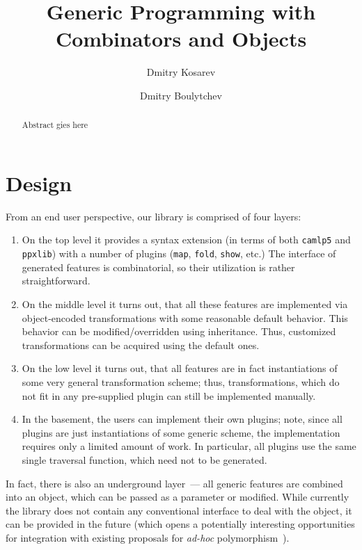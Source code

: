 \documentclass[submission,copyright,creativecommons]{eptcs}
\title{Generic Programming with Combinators and Objects}
\author{Dmitry Kosarev
  \institute{St. Petersburg State University\\
    JetBrains Research \\
    St. Petersburg, Russia}
\email{Dmitrii.Kosarev@protonmail.ch}
\and
Dmitry Boulytchev
\institute{St. Petersburg State University\\
  JetBrains Research \\
  St. Petersburg, Russia}
\email{dboulytchev@math.spbu.ru}
}
\newcommand{\cd}[1]{\texttt{#1}}
\begin{document}
\maketitle

\begin{abstract}
  Abstract gies here
\end{abstract}


\section{Design}


From an end user perspective, our library is comprised of four layers:

\begin{enumerate}
\item On the top level it provides a syntax extension (in terms of both \cd{camlp5} and \cd{ppxlib}) with a number of plugins
(\cd{map}, \cd{fold}, \cd{show}, etc.) The interface of generated features is combinatorial, so their utilization is rather straightforward.
  
\item On the middle level it turns out, that all these features are implemented via object-encoded transformations with some reasonable
default behavior. This behavior can be modified/overridden using inheritance. Thus, customized transformations can be acquired using
the default ones.

\item On the low level it turns out, that all features are in fact instantiations of some very general transformation scheme; thus, transformations,
which do not fit in any pre-supplied plugin can still be implemented manually.
  
\item In the basement, the users can implement their own plugins; note, since all plugins are just instantiations of some generic scheme, the implementation
requires only a limited amount of work. In particular, all plugins use the same single traversal function, which need not to be generated.
\end{enumerate}

In fact, there is also an underground layer~--- all generic features are combined into an object, which can be passed as a parameter or modified. While
currently the library does not contain any conventional interface to deal with the object, it can be provided in the future (which opens a potentially
interesting opportunities for integration with existing proposals for \emph{ad-hoc} polymorphism~\cite{ModularImplicits}).
\end{document}
